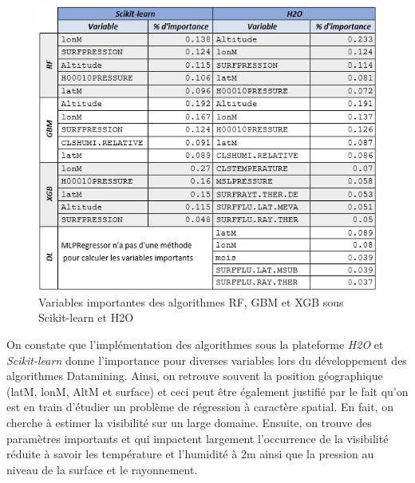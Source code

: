\begin{figure}[!h]
    \includegraphics{img/ImpV.JPG}
    \caption{Variables importantes des algorithmes RF, GBM et XGB sous Scikit-learn et H2O}
    \label{fig:impVar}
\end{figure}

 On constate que l'implémentation des algorithmes sous la plateforme \textit{H2O} et \textit{Scikit-learn} donne l'importance pour diverses variables lors du développement des algorithmes Datamining. Ainsi, on retrouve souvent la position géographique (latM, lonM, AltM et surface) et ceci peut être également justifié par le fait qu'on est en train d'étudier un problème de régression à caractère spatial. En fait, on cherche à estimer la visibilité sur un large domaine. Ensuite, on trouve des paramètres importants et qui impactent largement l'occurrence de la visibilité réduite à savoir les température et l'humidité à 2m ainsi que la pression au niveau de la surface et le rayonnement.\\




